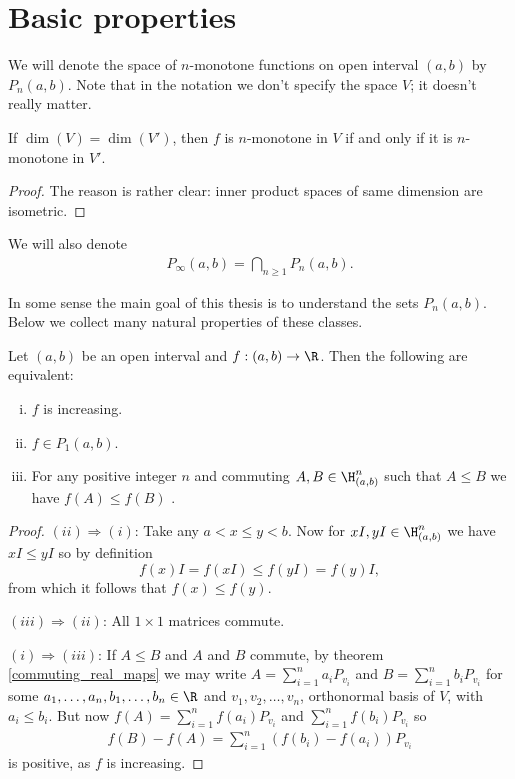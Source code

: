 \section{Basic properties}

We will denote the space of $n$-monotone functions on open interval $(a, b)$ by $P_{n}(a, b)$. Note that in the notation we don't specify the space $V$; it doesn't really matter.

\begin{prop}
	If $\dim(V) = \dim(V')$, then $f$ is $n$-monotone in $V$ if and only if it is $n$-monotone in $V'$.
\end{prop}
\begin{proof}
	The reason is rather clear: inner product spaces of same dimension are isometric.
\end{proof}

We will also denote
\begin{align*}
	P_{\infty}(a, b) = \bigcap_{n \geq 1} P_{n}(a, b).
\end{align*}

In some sense the main goal of this thesis is to understand the sets $P_{n}(a, b)$. Below we collect many natural properties of these classes.

\begin{prop}
	Let $(a, b)$ be an open interval and $f : (a, b) \to \R$. Then the following are equivalent:
	\begin{enumerate}[(i)]
		\item $f$ is increasing.
		\item $f \in P_{1}(a, b)$.
		\item For any positive integer $n$ and commuting $A, B \in \H^{n}_{(a, b)}$ such that $A \leq B$ we have $f(A) \leq f(B)$ .
	\end{enumerate}
\end{prop}
\begin{proof}
	$(ii) \Rightarrow (i)$: Take any $a < x \leq y < b$. Now for $xI, yI \in \H^{n}_{(a, b)}$ we have $x I \leq y I$ so by definition
	\[
		f(x) I = f(xI) \leq f(y I) = f(y) I,
	\]
	from which it follows that $f(x) \leq f(y)$.

	$(iii) \Rightarrow (ii)$: All $1 \times 1$ matrices commute.
	

	$(i) \Rightarrow (iii)$: If $A \leq B$ and $A$ and $B$ commute, by theorem \ref{commuting_real_maps} we may write $A = \sum_{i = 1}^{n} a_{i} P_{v_{i}}$ and $B = \sum_{i = 1}^{n} b_{i} P_{v_{i}}$ for some $a_{1}, \ldots, a_{n}, b_{1}, \ldots, b_{n} \in \R$ and $v_{1}, v_{2}, \ldots, v_{n}$, orthonormal basis of $V$, with $a_{i} \leq b_{i}$. But now $f(A) = \sum_{i = 1}^{n} f(a_{i}) P_{v_{i}}$ and $\sum_{i = 1}^{n} f(b_{i}) P_{v_{i}}$ so
	\begin{align*}
		f(B) - f(A) = \sum_{i = 1}^{n} (f(b_{i}) - f(a_{i})) P_{v_{i}}
	\end{align*}
	is positive, as $f$ is increasing.
\end{proof}

